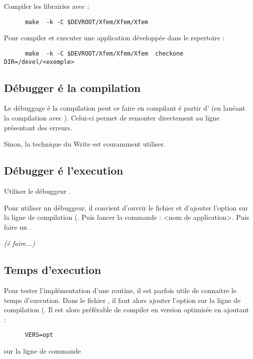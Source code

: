 Compiler les librairies avec :
\begin{verbatim}
      make  -k -C $DEVROOT/Xfem/Xfem/Xfem
\end{verbatim}

Pour compiler et executer une application d\'evelopp\'ee dans le
repertoire :
\begin{verbatim}
      make  -k -C $DEVROOT/Xfem/Xfem/Xfem  checkone DIR=/devel/<exemple>
\end{verbatim}





\subsection{D\'ebugger \'e la compilation}

Le d\'ebuggage \'e la compilation peut ce faire en compilant \'e partir
d' (en lan\'eant la compilation avec ).
Celui-ci permet de remonter directement au ligne pr\'esentant des
erreurs.

Sinon, la technique du Write est couramment utiliser.

\subsection{D\'ebugger \'e l'execution}

Utiliser le d\'ebuggeur .

Pour utiliser un d\'ebuggeur, il convient d'ouvrir le fichier
 et d'ajouter l'option  sur la ligne de
compilation (. Puis lancer la commande : <nom de application>. Puis faire un .

\textit{(\'e faire...)}

\subsection{Temps d'execution}

Pour tester l'impl\'ementation d'une routine, il est parfois utile de
connaitre le temps d'execution. Dans le fichier , il
faut alors ajouter l'option  sur la ligne de compilation
(. Il est alors pr\'ef\'erable de compiler en version
optimis\'ee en ajoutant :
\begin{verbatim}
      VERS=opt
\end{verbatim}
sur la ligne de commande 

